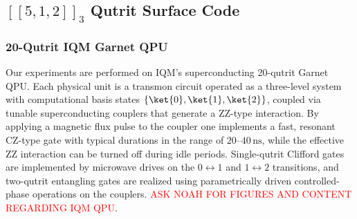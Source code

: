 \newcommand{\FiveQPatchCircles}{%
  \foreach \P/\txt in {q0/0,q1/1,q2/2,q3/3,q4/4}{
    \draw[fill=white] (\P) circle (\qdR);
    \node[font=\tiny] at (\P) {\txt};
  }
  \WedgeArrow{q0}{0}\WedgeArrow{q1}{0}\WedgeArrow{q3}{0}\WedgeArrow{q4}{0}\WedgeArrow{q2}{90}
}

\newcommand{\FiveQPatchCirclesSmall}{%
  \foreach \P/\txt in {q0/0,q1/1,q2/2,q3/3,q4/4}{
    \draw[fill=white] (\P) circle (\qdR);
    \node[font=\tiny] at (\P) {\txt};
  }
  \WedgeArrow{q0}{0}\WedgeArrow{q1}{0}\WedgeArrow{q3}{0}\WedgeArrow{q4}{0}\WedgeArrow{q2}{90}
}

\newcommand{\FiveQPatchCirclesOneUnderThree}{%
  \foreach \P/\txt in {q0/0,q2/2,q4/4}{
    \draw[fill=white] (\P) circle (\qdR);
    \node[font=\tiny] at (\P) {\txt};
  }
  \def\off{0.10}
  \coordinate (qoneBR) at ($(q3)+(\off,-\off)$);
  \draw[fill=white] (qoneBR) circle (\qdR);
  \node[font=\tiny] at (qoneBR) {1};
  \draw[fill=white] (q3) circle (\qdR);
  \node[font=\tiny] at (q3) {3};
  \WedgeArrow{q0}{0}\WedgeArrow{q3}{0}\WedgeArrow{q4}{0}\WedgeArrow{q2}{90}\WedgeArrow{qoneBR}{0}
}

\subsection{$[[5,1,2]]_3$ Qutrit Surface Code}

\subsubsection{20-Qutrit IQM Garnet QPU}

Our experiments are performed on IQM's superconducting 20-qutrit Garnet QPU.  Each physical unit is a transmon circuit operated as a three-level system with computational basis states $\{\ket{0},\ket{1},\ket{2}\}$, coupled via tunable superconducting couplers that generate a ZZ-type interaction.  By applying a magnetic
flux pulse to the coupler one implements a fast, resonant CZ-type gate with typical durations in the range of $20$--$40\,\mathrm{ns}$, while
the effective ZZ interaction can be turned off during idle periods. Single-qutrit Clifford gates are implemented by microwave drives on the
$0\!\leftrightarrow\!1$ and $1\!\leftrightarrow\!2$ transitions, and two-qutrit entangling gates are realized using parametrically driven controlled-phase operations on the couplers. \textcolor{red}{ASK NOAH FOR FIGURES AND CONTENT REGARDING IQM QPU}.

